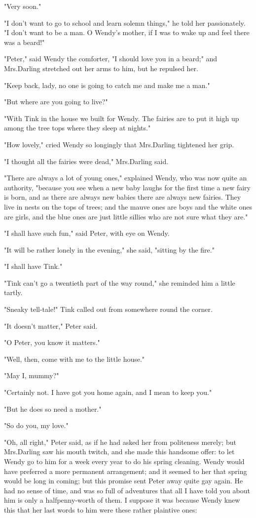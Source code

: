 "Very soon."

"I don't want to go to school and learn solemn things," he told her passionately.
"I don't want to be a man.
O Wendy's mother, if I was to wake up and feel there was a beard!"

"Peter," said Wendy the comforter, "I should love you in a beard;" and Mrs.\@ Darling stretched out her arms to him, but he repulsed her.

"Keep back, lady, no one is going to catch me and make me a man."

"But where are you going to live?"

"With Tink in the house we built for Wendy.
The fairies are to put it high up among the tree tops where they sleep at nights."

"How lovely," cried Wendy so longingly that Mrs.\@ Darling tightened her grip.

"I thought all the fairies were dead," Mrs.\@ Darling said.

"There are always a lot of young ones," explained Wendy, who was now quite an authority, "because you see when a new baby laughs for the first time a new fairy is born, and as there are always new babies there are always new fairies.
They live in nests on the tops of trees;
and the mauve ones are boys and the white ones are girls, and the blue ones are just little sillies who are not sure what they are."

"I shall have such fun," said Peter, with eye on Wendy.

"It will be rather lonely in the evening," she said, "sitting by the fire."

"I shall have Tink."

"Tink can't go a twentieth part of the way round," she reminded him a little tartly.

"Sneaky tell-tale!\@" Tink called out from somewhere round the corner.

"It doesn't matter," Peter said.

"O Peter, you know it matters."

"Well, then, come with me to the little house."

"May I, mummy?"

"Certainly not.
I have got you home again, and I mean to keep you."

"But he does so need a mother."

"So do you, my love."

"Oh, all right," Peter said, as if he had asked her from politeness merely;
but Mrs.\@ Darling saw his mouth twitch, and she made this handsome offer:
to let Wendy go to him for a week every year to do his spring cleaning.
Wendy would have preferred a more permanent arrangement;
and it seemed to her that spring would be long in coming;
but this promise sent Peter away quite gay again.
He had no sense of time, and was so full of adventures that all I have told you about him is only a halfpenny-worth of them.
I suppose it was because Wendy knew this that her last words to him were these rather plaintive ones:

